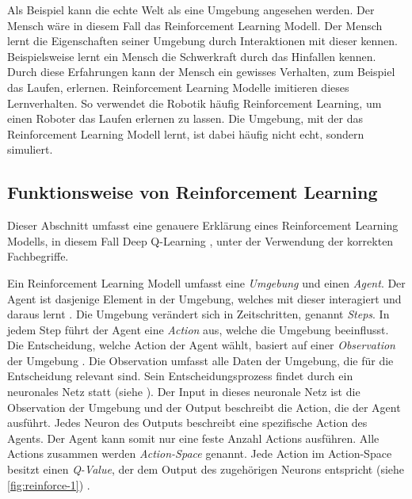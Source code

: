 Als Beispiel kann die echte Welt als eine Umgebung angesehen werden. Der Mensch
wäre in diesem Fall das Reinforcement Learning Modell. Der Mensch lernt die
Eigenschaften seiner Umgebung durch Interaktionen mit dieser kennen.
Beispielsweise lernt ein Mensch die Schwerkraft durch das Hinfallen kennen.
Durch diese Erfahrungen kann der Mensch ein gewisses Verhalten, zum Beispiel das
Laufen, erlernen. Reinforcement Learning Modelle imitieren dieses Lernverhalten.
So verwendet die Robotik häufig Reinforcement Learning, um einen Roboter das
Laufen erlernen zu lassen. Die Umgebung, mit der das Reinforcement Learning
Modell lernt, ist dabei häufig nicht echt, sondern simuliert.
 
\subsection{Funktionsweise von Reinforcement Learning}\label{sub:t_rl_func}
Dieser Abschnitt umfasst eine genauere Erklärung eines Reinforcement Learning
Modells, in diesem Fall Deep Q-Learning \cite{mnih_playing_2013}, unter der
Verwendung der korrekten Fachbegriffe.
 
Ein Reinforcement Learning Modell umfasst eine \emph{Umgebung} und einen
\emph{Agent}. Der Agent ist dasjenige Element in der Umgebung, welches mit
dieser interagiert und daraus lernt \cite[S. 53]{sutton_reinforcement_2014}. Die
Umgebung verändert sich in Zeitschritten, genannt \emph{Steps}. In jedem Step
führt der Agent eine \emph{Action} aus, welche die Umgebung beeinflusst. Die
Entscheidung, welche Action der Agent wählt, basiert auf einer
\emph{Observation} der Umgebung \cite[S. 2]{mnih_playing_2013}. Die Observation
umfasst alle Daten der Umgebung, die für die Entscheidung relevant sind. Sein Entscheidungsprozess findet durch ein neuronales Netz statt
(siehe ). Der Input in dieses neuronale Netz ist die
Observation der Umgebung und der Output beschreibt die Action, die der Agent
ausführt. Jedes Neuron des Outputs beschreibt eine spezifische Action des
Agents. Der Agent kann somit nur eine feste Anzahl Actions ausführen. Alle
Actions zusammen werden \emph{Action-Space} \cite[S.
67]{sutton_reinforcement_2014} genannt. Jede Action im Action-Space besitzt
einen \emph{Q-Value}, der dem Output des zugehörigen Neurons entspricht (siehe
\autoref{fig:reinforce-1}) \cite{wang_deep_2021}. 


